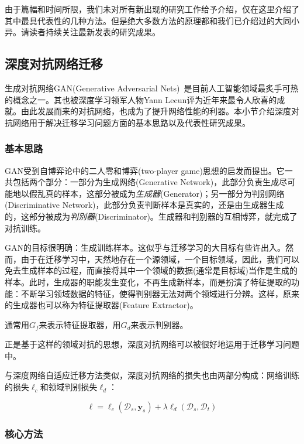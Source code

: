 由于篇幅和时间所限，我们未对所有新出现的研究工作给予介绍，仅在这里介绍了其中最具代表性的几种方法。但是绝大多数方法的原理都和我们已介绍过的大同小异。请读者持续关注最新发表的研究成果。

\subsection{深度对抗网络迁移}

生成对抗网络GAN(Generative Adversarial Nets)~\cite{goodfellow2014generative}是目前人工智能领域最炙手可热的概念之一。其也被深度学习领军人物Yann Lecun评为近年来最令人欣喜的成就。由此发展而来的对抗网络，也成为了提升网络性能的利器。本小节介绍深度对抗网络用于解决迁移学习问题方面的基本思路以及代表性研究成果。

\subsubsection{基本思路}

GAN受到自博弈论中的二人零和博弈(two-player game)思想的启发而提出。它一共包括两个部分：一部分为生成网络(Generative Network)，此部分负责生成尽可能地以假乱真的样本，这部分被成为\textit{生成器}(Generator)；另一部分为判别网络(Discriminative Network)，此部分负责判断样本是真实的，还是由生成器生成的，这部分被成为\textit{判别器}(Discriminator)。生成器和判别器的互相博弈，就完成了对抗训练。

GAN的目标很明确：生成训练样本。这似乎与迁移学习的大目标有些许出入。然而，由于在迁移学习中，天然地存在一个源领域，一个目标领域，因此，我们可以免去生成样本的过程，而直接将其中一个领域的数据(通常是目标域)当作是生成的样本。此时，生成器的职能发生变化，不再生成新样本，而是扮演了特征提取的功能：不断学习领域数据的特征，使得判别器无法对两个领域进行分辨。这样，原来的生成器也可以称为特征提取器(Feature Extractor)。

通常用$G_f$来表示特征提取器，用$G_d$来表示判别器。

正是基于这样的领域对抗的思想，深度对抗网络可以被很好地运用于迁移学习问题中。

与深度网络自适应迁移方法类似，深度对抗网络的损失也由两部分构成：网络训练的损失$\ell_c$和领域判别损失$\ell_d$：

\begin{equation}
	\ell = \ell_c(\mathcal{D}_s,\mathbf{y}_s) + \lambda \ell_d(\mathcal{D}_s,\mathcal{D}_t)
\end{equation}

\subsubsection{核心方法}

